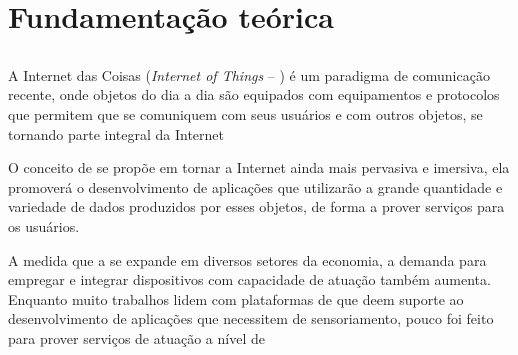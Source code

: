 \chapter{Fundamentação teórica} \label{chap:fundamentacao}

\section{\iot}

A Internet das Coisas (\textit{Internet of Things} -- \iot) é um paradigma de comunicação recente, onde objetos do dia a dia são equipados com equipamentos e protocolos que permitem que se comuniquem com seus usuários e com outros objetos, se tornando parte integral da Internet %

O conceito de \iot{} se propõe em tornar a Internet ainda mais pervasiva e imersiva, ela promoverá o desenvolvimento de aplicações que utilizarão a grande quantidade e variedade de dados produzidos por esses objetos, de forma a prover serviços para os usuários. 

A medida que a \iot{} se expande em diversos setores da economia, a demanda para empregar e integrar dispositivos com capacidade de atuação também aumenta. Enquanto muito trabalhos lidem com plataformas de \middleware{} que deem suporte ao desenvolvimento de aplicações que necessitem de sensoriamento, pouco foi feito para prover serviços de atuação a nível de \middleware{} %


